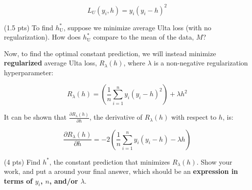 \documentclass[twoside,12pt]{article}
\begin{document}
\begin{probset}
\begin{prob}[(13 pts)]
\vspace{-0.1in}

$$L_U(y_i, h) = y_i (y_i - h)^2$$

\begin{subprobset}

\begin{subprob}(1.5 pts) To find $h_\text{U}^*$, suppose we minimize average Ulta loss (with no regularization). How does $h_\text{U}^*$ compare to the mean of the data, $M$?






\end{subprob}

\end{subprobset}

Now, to find the optimal constant prediction, we will instead minimize \textbf{regularized} average Ulta loss, $R_\lambda(h)$, where $\lambda$ is a non-negative regularization hyperparameter:

$$R_\lambda(h) = \left( \frac{1}{n} \sum_{i = 1}^n y_i (y_i - h)^2 \right) + \lambda h^2$$

It can be shown that $\displaystyle \frac{\partial R_\lambda(h)}{\partial h}$, the derivative of $R_\lambda(h)$ with respect to $h$, is:

$$\frac{\partial R_\lambda(h)}{\partial h} = -2 \left( \frac{1}{n} \sum_{i = 1}^n y_i (y_i - h) - \lambda h \right)$$

\begin{subprobset}

\begin{subprob}(4 pts) Find $h^*$, the constant prediction that minimizes $R_\lambda(h)$. Show your work, and put a  around your final answer, which should be an \textbf{expression in terms of $y_i$, $n$, and/or $\lambda$}.

\begin{responsebox}{3.8in}
    
\end{responsebox}

\end{subprob}

\end{subprobset}


\end{prob}
\end{probset}
\end{document}
